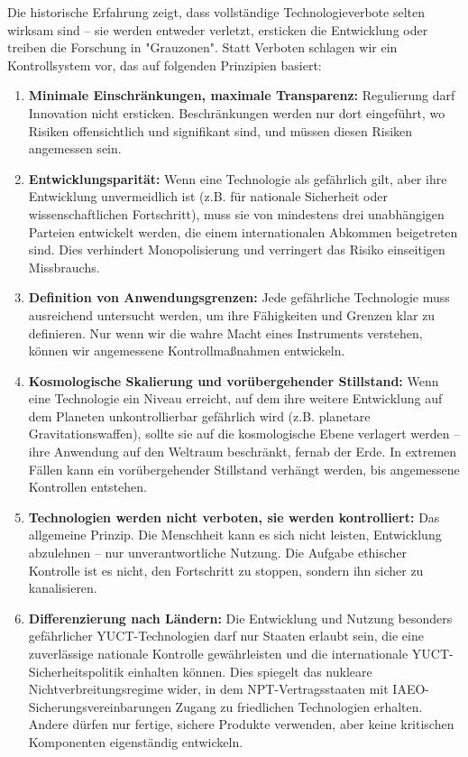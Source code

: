 \documentclass[12pt,a4paper]{article}
\theoremstyle{remark}
\begin{document}
	Die historische Erfahrung zeigt, dass vollständige Technologieverbote selten wirksam sind – sie werden entweder verletzt, ersticken die Entwicklung oder treiben die Forschung in "Grauzonen". Statt Verboten schlagen wir ein Kontrollsystem vor, das auf folgenden Prinzipien basiert:
	
	\begin{enumerate}[leftmargin=*]
		\item \textbf{Minimale Einschränkungen, maximale Transparenz:} Regulierung darf Innovation nicht ersticken. Beschränkungen werden nur dort eingeführt, wo Risiken offensichtlich und signifikant sind, und müssen diesen Risiken angemessen sein.
		
		\item \textbf{Entwicklungsparität:} Wenn eine Technologie als gefährlich gilt, aber ihre Entwicklung unvermeidlich ist (z.B. für nationale Sicherheit oder wissenschaftlichen Fortschritt), muss sie von mindestens drei unabhängigen Parteien entwickelt werden, die einem internationalen Abkommen beigetreten sind. Dies verhindert Monopolisierung und verringert das Risiko einseitigen Missbrauchs.
		
		\item \textbf{Definition von Anwendungsgrenzen:} Jede gefährliche Technologie muss ausreichend untersucht werden, um ihre Fähigkeiten und Grenzen klar zu definieren. Nur wenn wir die wahre Macht eines Instruments verstehen, können wir angemessene Kontrollmaßnahmen entwickeln.
		
		\item \textbf{Kosmologische Skalierung und vorübergehender Stillstand:} Wenn eine Technologie ein Niveau erreicht, auf dem ihre weitere Entwicklung auf dem Planeten unkontrollierbar gefährlich wird (z.B. planetare Gravitationswaffen), sollte sie auf die kosmologische Ebene verlagert werden – ihre Anwendung auf den Weltraum beschränkt, fernab der Erde. In extremen Fällen kann ein vorübergehender Stillstand verhängt werden, bis angemessene Kontrollen entstehen.
		
		\item \textbf{Technologien werden nicht verboten, sie werden kontrolliert:} Das allgemeine Prinzip. Die Menschheit kann es sich nicht leisten, Entwicklung abzulehnen – nur unverantwortliche Nutzung. Die Aufgabe ethischer Kontrolle ist es nicht, den Fortschritt zu stoppen, sondern ihn sicher zu kanalisieren.
		
		\item \textbf{Differenzierung nach Ländern:} Die Entwicklung und Nutzung besonders gefährlicher YUCT-Technologien darf nur Staaten erlaubt sein, die eine zuverlässige nationale Kontrolle gewährleisten und die internationale YUCT-Sicherheitspolitik einhalten können. Dies spiegelt das nukleare Nichtverbreitungsregime wider, in dem NPT-Vertragsstaaten mit IAEO-Sicherungsvereinbarungen Zugang zu friedlichen Technologien erhalten. Andere dürfen nur fertige, sichere Produkte verwenden, aber keine kritischen Komponenten eigenständig entwickeln.
	\end{enumerate}
	
\end{document}
